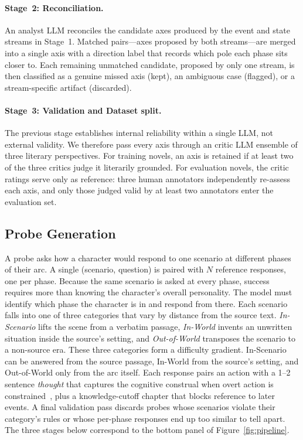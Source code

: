 \documentclass[11pt]{article}
\begin{document}
\paragraph{Stage~2: Reconciliation.}
An analyst LLM reconciles the candidate axes produced by the event and state streams in Stage~1. Matched pairs---axes proposed by both streams---are merged into a single axis with a direction label that records which pole each phase sits closer to. Each remaining unmatched candidate, proposed by only one stream, is then classified as a genuine missed axis (kept), an ambiguous case (flagged), or a stream-specific artifact (discarded).

\paragraph{Stage~3: Validation and Dataset split.}
The previous stage establishes internal reliability within a single LLM, not external validity. We therefore pass every axis through an critic LLM ensemble of three literary perspectives. For training novels, an axis is retained if at least two of the three critics judge it literarily grounded. For evaluation novels, the critic ratings serve only as reference: three human annotators independently re-assess each axis, and only those judged valid by at least two annotators enter the evaluation set.

\subsection{Probe Generation\label{sec:probe}}

A probe asks how a character would respond to one scenario at different phases of their arc. A single (scenario, question) is paired with $N$ reference responses, one per phase. Because the same scenario is asked at every phase, success requires more than knowing the character's overall personality. The model must identify which phase the character is in and respond from there. Each scenario falls into one of three categories that vary by distance from the source text. \emph{In-Scenario} lifts the scene from a verbatim passage, \emph{In-World} invents an unwritten situation inside the source's setting, and \emph{Out-of-World} transposes the scenario to a non-source era. These three categories form a difficulty gradient. In-Scenario can be answered from the source passage, In-World from the source's setting, and Out-of-World only from the arc itself. Each response pairs an action with a 1--2 sentence \emph{thought} that captures the cognitive construal when overt action is constrained~\cite{Mischel1995ACS}, plus a knowledge-cutoff chapter that blocks reference to later events. A final validation pass discards probes whose scenarios violate their category's rules or whose per-phase responses end up too similar to tell apart. The three stages below correspond to the bottom panel of Figure~\ref{fig:pipeline}.
\end{document}
